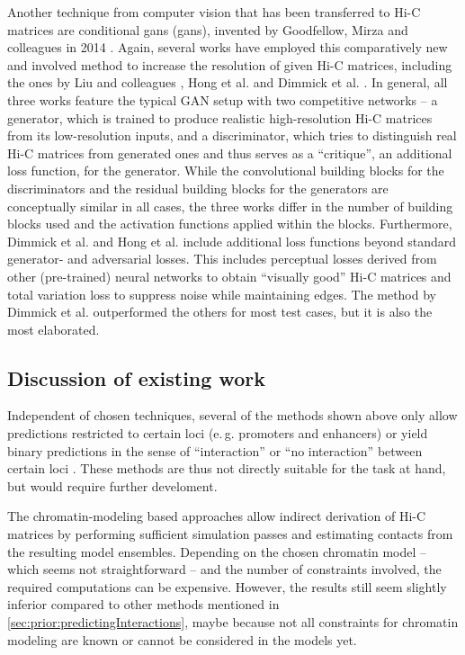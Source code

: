 Another technique from computer vision that has been transferred to Hi-C matrices are conditional \acrlong{gan}s (\acrshort{gan}s), 
invented by Goodfellow, Mirza and colleagues in 2014 \cite{Goodfellow2014, mirza2014}. 
Again, several works have employed this comparatively new and involved method to increase the resolution of given Hi-C matrices, 
including the ones by Liu and colleagues \cite{Liu2019}, Hong et al. \cite{Hong2020} and Dimmick et al. \cite{Dimmick2020}.
In general, all three works feature the typical GAN setup with two competitive networks -- a generator, 
which is trained to produce realistic high-resolution Hi-C matrices from its low-resolution inputs, 
and a discriminator, which tries to distinguish real Hi-C matrices from generated ones and thus serves as a ``critique'', an additional loss function, for the generator.
While the convolutional building blocks for the discriminators and the residual building blocks for the generators are conceptually similar
in all cases, the three works differ in the number of building blocks used and the activation functions applied within the blocks.
Furthermore, Dimmick et al. and Hong et al. include additional loss functions beyond standard generator- and adversarial losses. 
This includes perceptual losses derived from other (pre-trained) neural networks to obtain ``visually good'' Hi-C matrices and total variation loss to suppress noise
while maintaining edges. 
The method by Dimmick et al. outperformed the others for most test cases, but it is also the most elaborated.

\subsection{Discussion of existing work}
Independent of chosen techniques, several of the methods shown above only allow predictions restricted to certain loci (e.\,g. promoters and enhancers)
or yield binary predictions in the sense of ``interaction'' or ``no interaction'' between certain loci \cite{Bkhetan2018, Kai2018,Martens2020,Singh2019}.
These methods are thus not directly suitable for the task at hand, but would require further develoment.

The chromatin-modeling based approaches \cite{Brackley2016, MacPherson2018, Pierro2017, Qi2019} allow indirect derivation of Hi-C matrices
by performing sufficient simulation passes and estimating contacts from the resulting model ensembles.
Depending on the chosen chromatin model -- which seems not straightforward \cite{Huang2018, Bendandi2020} -- and the number of constraints involved,
the required computations can be expensive.
However, the results still seem slightly inferior compared to other methods mentioned in \cref{sec:prior:predictingInteractions}, 
maybe because not all constraints for chromatin modeling are known or cannot be considered in the models yet.

